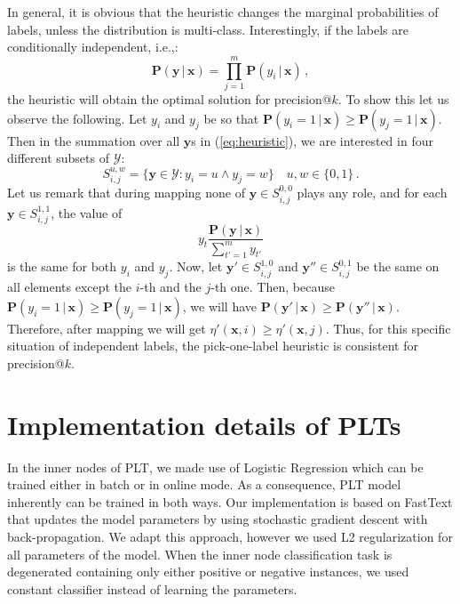 \documentclass{article}
\renewcommand{\vec}[1]{\boldsymbol{#1}}
\newcommand{\bx}{\vec{x}}
\newcommand{\by}{\vec{y}}
\newcommand{\calY}{\mathcal{Y}}
\newcommand{\prob}{\mathbf{P}}
\newcommand{\given}{\, | \,}
\newcommand{\sectionBefore}{-0pt}
\newcommand{\sectionAfter}{-0pt}
\begin{document}
In general, it is obvious that the heuristic changes the marginal probabilities of labels, unless the distribution is multi-class. 
Interestingly, if the labels are conditionally independent, i.e.,:
$$
\prob(\by \given \bx) = \prod_{j=1}^m \prob(y_i \given \bx)\,,
$$
the heuristic will obtain the optimal solution for precision@$k$. To show this let us observe the following.
Let $y_i$ and $y_j$ be so that $\prob(y_i = 1 \given \bx) \ge \prob(y_j = 1 \given \bx) $. Then in the summation over all $\by$s in (\ref{eq:heuristic}), we are interested in four different subsets of $\calY$: 
$$
S_{i,j}^{u,w}  =  \{\by\in \calY: y_i = u \land y_j = w\} \quad u,w \in \{0,1\} \,.
$$
Let us remark that during mapping none of $\by \in S^{0,0}_{i,j}$ plays any role, and for each $\by \in S^{1,1}_{i,j}$, the value of 
$$
y_t \frac{\prob(\by \given \bx)}{\sum_{t'=1}^m y_{t'}}
$$ 
is the same for both $y_i$ and $y_j$. Now, let $\by' \in S^{1,0}_{i,j}$ and $\by'' \in S^{0,1}_{i,j}$ be the same on all elements except the $i$-th and the $j$-th one. Then, because   $\prob(y_i = 1 \given \bx) \ge \prob(y_j = 1 \given \bx) $, we will have $\prob(\by' \given \bx) \ge \prob(\by'' \given \bx)$. Therefore, after mapping we will get $\eta'(\bx,i) \ge \eta'(\bx, j)$. 
Thus, for this specific situation of independent labels, the pick-one-label heuristic is consistent for precision@$k$.

%
%
%




\vspace{\sectionBefore}
\section{Implementation details of PLTs}
\label{sec:plt-tagging}
\vspace{\sectionAfter}

In the inner nodes of PLT, we made use of Logistic Regression which can be trained either in batch or in online mode. As a consequence, PLT model inherently can be trained in both ways. Our implementation is based on FastText that updates the model parameters by using stochastic gradient descent with back-propagation. We adapt this approach, however we used L2 regularization for all parameters of the model. When the inner node classification task is degenerated containing only either positive or negative instances, we used constant classifier instead of learning the parameters.
\end{document}
